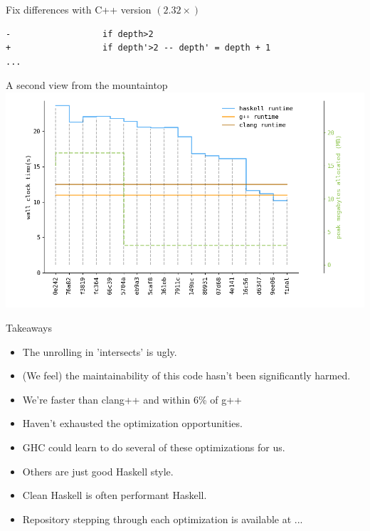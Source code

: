 \documentclass[8pt]{beamer}
\begin{document}
\begin{frame}[fragile]{Fix differences with C++ version $(2.32\times)$}
\begin{verbatim}
-                  if depth>2
+                  if depth'>2 -- depth' = depth + 1
...
\end{verbatim}
\end{frame}


\begin{frame}[fragile]{A second view from the mountaintop}
\includegraphics[height=0.6\textwidth]{perfdata-upto-9ee06-gen.png}
\end{frame}


\begin{frame}[fragile]{Takeaways}
\begin{itemize}
\item The unrolling in 'intersects' is ugly.
\item (We feel) the maintainability of this code hasn’t been significantly harmed.
\item We're faster than clang++ and within 6\% of g++
\item Haven't exhausted the optimization opportunities.
\item GHC could learn to do several of these optimizations for us.
\item Others are just good Haskell style. 
\item Clean Haskell is often performant Haskell.
\item Repository stepping through each optimization is available at ...
\end{itemize}

\end{frame}
\end{document}

